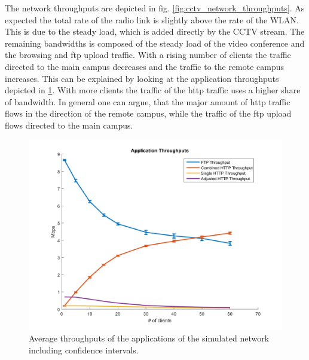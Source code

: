 \documentclass[
10pt, %
a4paper, %
oneside, %
headinclude,footinclude, %
BCOR5mm, %
]{scrartcl}
\begin{document}
The network throughputs are depicted in fig. \ref{fig:cctv_network_throughputs}. As expected the total rate of the radio link is slightly above the rate of the WLAN. This is due to the steady load, which is added directly by the CCTV stream. The remaining bandwidths is composed of the steady load of the video conference and the browsing and ftp upload traffic. With a rising number of clients the traffic directed to the main campus decreases and the traffic to the remote campus increases. This can be explained by looking at the application throughputs depicted in \ref{fig:cctv_app_throughput_all}. With more clients the traffic of the http traffic uses a higher share of bandwidth. In general one can argue, that the major amount of http traffic flows in the direction of the remote campus, while the traffic of the ftp upload flows directed to the main campus.
\begin{figure}[!ht]
  \centering
  \includegraphics[width=\textwidth]{Figures/cctv_application_throughputs_all.png}
  \caption{Average throughputs of the applications of the simulated network including confidence intervals.} \label{fig:cctv_app_throughput_all}
\end{figure}
\end{document}
